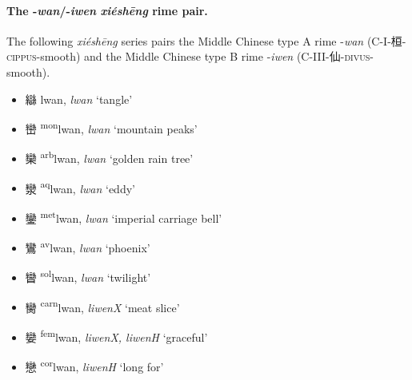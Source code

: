 \paragraph{The -\textit{wan}/-\textit{iwen} \textit{xiéshēng} rime pair.}
\label{par:wan-iwen-XS-pair}
The following \textit{xiéshēng} series pairs the Middle Chinese type A rime 
-\textit{wan} (C-I-桓-\textsc{cippus}-smooth)
and the Middle Chinese type B
rime -\textit{iwen}
(C-III-仙-\textsc{divus}-smooth).

\begin{itemize}
  \item {\Large{䜌}} %
    {\large{lwan}},
    \textit{lwan} `tangle' %

  \item {\Large{巒}} %
    {\large{{\textsuperscript{mon}}lwan}},
    \textit{lwan} `mountain peaks' %

  \item {\Large{欒}} %
    {\large{{\textsuperscript{arb}}lwan}},
    \textit{lwan} `golden rain tree' %

  \item {\Large{灓}} %
    {\large{{\textsuperscript{aq}}lwan}},
    \textit{lwan} `eddy' %

  \item {\Large{鑾}} %
    {\large{{\textsuperscript{met}}lwan}},
    \textit{lwan} `imperial carriage bell' %

  \item {\Large{鸞}} %
    {\large{{\textsuperscript{av}}lwan}},
    \textit{lwan} `phoenix' %


  \item {\Large{曫}} %
    {\large{{\textsuperscript{sol}}lwan}},
    \textit{lwan} `twilight' %

  \item {\Large{臠}} %
    {\large{{\textsuperscript{carn}}lwan}},
    \textit{liwenX} `meat slice' %

  \item {\Large{孌}} %
    {\large{{\textsuperscript{fem}}lwan}},
    \textit{liwenX, liwenH} `graceful' %

  \item {\Large{戀}} %
    {\large{{\textsuperscript{cor}}lwan}},
    \textit{liwenH} `long for' %


\end{itemize}
